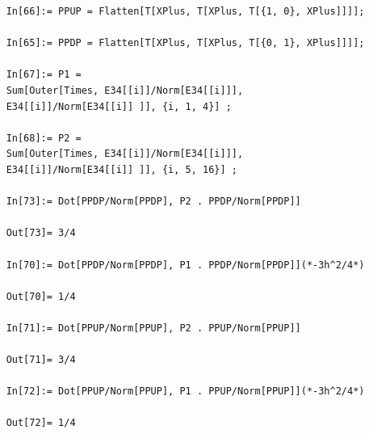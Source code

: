 \documentclass{article}
\theoremstyle{definition}
\begin{document}
\begin{enumerate}[label=(\alph*)]
\begin{lstlisting}
	In[66]:= PPUP = Flatten[T[XPlus, T[XPlus, T[{1, 0}, XPlus]]]];
	
	In[65]:= PPDP = Flatten[T[XPlus, T[XPlus, T[{0, 1}, XPlus]]]];
	
	In[67]:= P1 = 
	Sum[Outer[Times, E34[[i]]/Norm[E34[[i]]], 
	E34[[i]]/Norm[E34[[i]] ]], {i, 1, 4}] ;
	
	In[68]:= P2 = 
	Sum[Outer[Times, E34[[i]]/Norm[E34[[i]]], 
	E34[[i]]/Norm[E34[[i]] ]], {i, 5, 16}] ;
	
	In[73]:= Dot[PPDP/Norm[PPDP], P2 . PPDP/Norm[PPDP]]
	
	Out[73]= 3/4
	
	In[70]:= Dot[PPDP/Norm[PPDP], P1 . PPDP/Norm[PPDP]](*-3h^2/4*)
	
	Out[70]= 1/4
	
	In[71]:= Dot[PPUP/Norm[PPUP], P2 . PPUP/Norm[PPUP]]
	
	Out[71]= 3/4
	
	In[72]:= Dot[PPUP/Norm[PPUP], P1 . PPUP/Norm[PPUP]](*-3h^2/4*)
	
	Out[72]= 1/4
	\end{lstlisting}
	
	
	

\end{enumerate}
\end{document}
